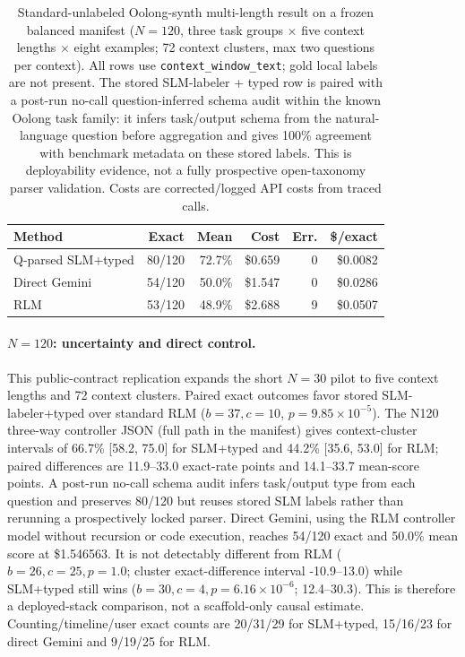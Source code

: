 \documentclass[letterpaper]{article}
\begin{document}
\begin{table}[t]
\centering
\small
\setlength{\tabcolsep}{4pt}
\begin{tabular}{@{}lrrrrr@{}}
\toprule
\textbf{Method} & \textbf{Exact} & \textbf{Mean} & \textbf{Cost} & \textbf{Err.} & \textbf{\$/exact} \\
\midrule
Q-parsed SLM+typed & 80/120 & 72.7\% & \$0.659 & 0 & \$0.0082 \\
Direct Gemini & 54/120 & 50.0\% & \$1.547 & 0 & \$0.0286 \\
RLM & 53/120 & 48.9\% & \$2.688 & 9 & \$0.0507 \\
\bottomrule
\end{tabular}
\caption{Standard-unlabeled Oolong-synth multi-length result on a frozen balanced manifest ($N=120$, three task groups $\times$ five context lengths $\times$ eight examples; 72 context clusters, max two questions per context). All rows use \texttt{context\_window\_text}; gold local labels are not present. The stored SLM-labeler + typed row is paired with a post-run no-call question-inferred schema audit within the known Oolong task family: it infers task/output schema from the natural-language question before aggregation and gives 100\% agreement with benchmark metadata on these stored labels. This is deployability evidence, not a fully prospective open-taxonomy parser validation. Costs are corrected/logged API costs from traced calls.}
\label{tab:supp-oolong-standard-n120}
\end{table}

\paragraph{$N=120$: uncertainty and direct control.}
This public-contract replication expands the short $N=30$ pilot to five context lengths and 72 context clusters. Paired exact outcomes favor stored SLM-labeler+typed over standard RLM ($b=37,c=10$, $p=9.85\times10^{-5}$). The N120 three-way controller JSON (full path in the manifest) gives context-cluster intervals of 66.7\% [58.2, 75.0] for SLM+typed and 44.2\% [35.6, 53.0] for RLM; paired differences are 11.9--33.0 exact-rate points and 14.1--33.7 mean-score points. A post-run no-call schema audit infers task/output type from each question and preserves 80/120 but reuses stored SLM labels rather than rerunning a prospectively locked parser. Direct Gemini, using the RLM controller model without recursion or code execution, reaches 54/120 exact and 50.0\% mean score at \$1.546563. It is not detectably different from RLM ($b=26,c=25,p=1.0$; cluster exact-difference interval -10.9--13.0) while SLM+typed still wins ($b=30,c=4,p=6.16\times10^{-6}$; 12.4--30.3). This is therefore a deployed-stack comparison, not a scaffold-only causal estimate. Counting/timeline/user exact counts are 20/31/29 for SLM+typed, 15/16/23 for direct Gemini and 9/19/25 for RLM.
\end{document}
